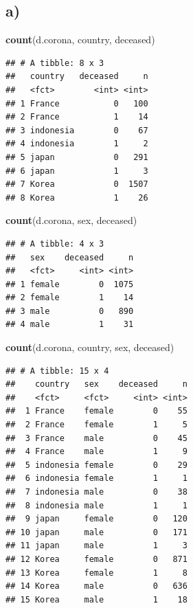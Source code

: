 \documentclass[
]{article}
\newenvironment{Shaded}{\begin{snugshade}}{\end{snugshade}}
\newcommand{\KeywordTok}[1]{\textcolor[rgb]{0.13,0.29,0.53}{\textbf{#1}}}
\newcommand{\NormalTok}[1]{#1}
\begin{document}
\hypertarget{a-1}{%
\subsection{a)}\label{a-1}}

\begin{Shaded}
\begin{Highlighting}[]
\KeywordTok{count}\NormalTok{(d.corona, country, deceased)}
\end{Highlighting}
\end{Shaded}

\begin{verbatim}
## # A tibble: 8 x 3
##   country   deceased     n
##   <fct>        <int> <int>
## 1 France           0   100
## 2 France           1    14
## 3 indonesia        0    67
## 4 indonesia        1     2
## 5 japan            0   291
## 6 japan            1     3
## 7 Korea            0  1507
## 8 Korea            1    26
\end{verbatim}

\begin{Shaded}
\begin{Highlighting}[]
\KeywordTok{count}\NormalTok{(d.corona, sex, deceased)}
\end{Highlighting}
\end{Shaded}

\begin{verbatim}
## # A tibble: 4 x 3
##   sex    deceased     n
##   <fct>     <int> <int>
## 1 female        0  1075
## 2 female        1    14
## 3 male          0   890
## 4 male          1    31
\end{verbatim}

\begin{Shaded}
\begin{Highlighting}[]
\KeywordTok{count}\NormalTok{(d.corona, country, sex, deceased)}
\end{Highlighting}
\end{Shaded}

\begin{verbatim}
## # A tibble: 15 x 4
##    country   sex    deceased     n
##    <fct>     <fct>     <int> <int>
##  1 France    female        0    55
##  2 France    female        1     5
##  3 France    male          0    45
##  4 France    male          1     9
##  5 indonesia female        0    29
##  6 indonesia female        1     1
##  7 indonesia male          0    38
##  8 indonesia male          1     1
##  9 japan     female        0   120
## 10 japan     male          0   171
## 11 japan     male          1     3
## 12 Korea     female        0   871
## 13 Korea     female        1     8
## 14 Korea     male          0   636
## 15 Korea     male          1    18
\end{verbatim}
\end{document}
